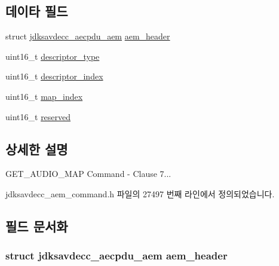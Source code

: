 \subsection*{데이타 필드}
\begin{DoxyCompactItemize}
\item 
struct \hyperlink{structjdksavdecc__aecpdu__aem}{jdksavdecc\+\_\+aecpdu\+\_\+aem} \hyperlink{structjdksavdecc__aem__command__get__audio__map_ae1e77ccb75ff5021ad923221eab38294}{aem\+\_\+header}
\item 
uint16\+\_\+t \hyperlink{structjdksavdecc__aem__command__get__audio__map_ab7c32b6c7131c13d4ea3b7ee2f09b78d}{descriptor\+\_\+type}
\item 
uint16\+\_\+t \hyperlink{structjdksavdecc__aem__command__get__audio__map_a042bbc76d835b82d27c1932431ee38d4}{descriptor\+\_\+index}
\item 
uint16\+\_\+t \hyperlink{structjdksavdecc__aem__command__get__audio__map_a3a5e0547986898ad64c07f238d8b7bcf}{map\+\_\+index}
\item 
uint16\+\_\+t \hyperlink{structjdksavdecc__aem__command__get__audio__map_a5a6ed8c04a3db86066924b1a1bf4dad3}{reserved}
\end{DoxyCompactItemize}


\subsection{상세한 설명}
G\+E\+T\+\_\+\+A\+U\+D\+I\+O\+\_\+\+M\+AP Command -\/ Clause 7... 

jdksavdecc\+\_\+aem\+\_\+command.\+h 파일의 27497 번째 라인에서 정의되었습니다.



\subsection{필드 문서화}
\subsubsection[{\texorpdfstring{aem\+\_\+header}{aem_header}}]{\setlength{\rightskip}{0pt plus 5cm}struct {\bf jdksavdecc\+\_\+aecpdu\+\_\+aem} aem\+\_\+header}\hypertarget{structjdksavdecc__aem__command__get__audio__map_ae1e77ccb75ff5021ad923221eab38294}{}\label{structjdksavdecc__aem__command__get__audio__map_ae1e77ccb75ff5021ad923221eab38294}


